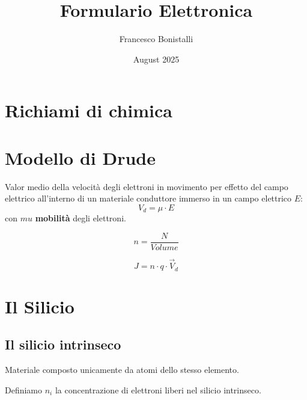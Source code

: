 \documentclass[11pt,a4paper,]{article}
\title{Formulario Elettronica}
\author{Francesco Bonistalli}
\date{August 2025}
\begin{document}
\maketitle
\tableofcontents

\section{Richiami di chimica}

\section{Modello di Drude}
\begin{definizione}
    Valor medio della velocità degli elettroni in movimento per effetto del campo elettrico all'interno di un materiale conduttore immerso in un campo elettrico $E$:
    \[
    V_d = \mu \cdot E
    \]
    con $mu$ \textbf{mobilità} degli elettroni.
\end{definizione}
\begin{definizione}
    \[
    n = \frac{N}{Volume}
    \]
\end{definizione}
\begin{definizione}
    \[
    J = n \cdot q \cdot \vec{V}_d
    \]
\end{definizione}

\section{Il Silicio}
\subsection{Il silicio intrinseco}
\begin{definizione}
    Materiale composto unicamente da atomi dello stesso elemento.
\end{definizione}
\begin{nota}
    Definiamo $n_i$ la concentrazione di elettroni liberi nel silicio intrinseco.
\end{nota}
\end{document}
